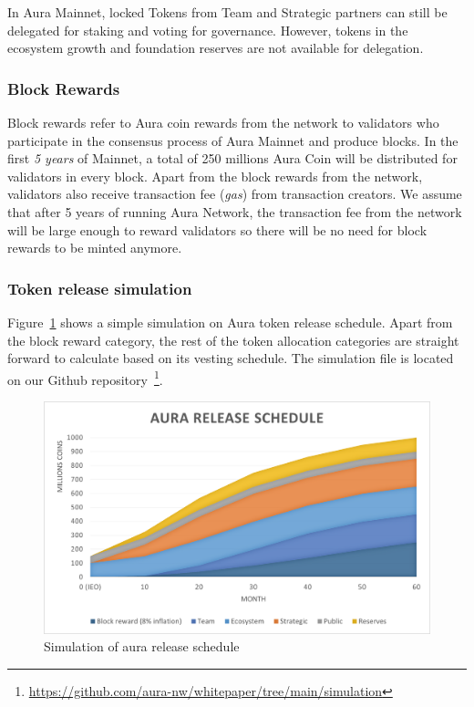 \documentclass[12pt, titlepage]{article}
\begin{document}
In Aura Mainnet, locked Tokens from Team and Strategic partners can still be delegated for staking and voting for governance. However, tokens in the ecosystem growth and foundation reserves are not available for delegation. 

\subsubsection{Block Rewards}
Block rewards refer to Aura coin rewards from the network to validators who participate in the consensus process of Aura Mainnet and produce blocks. In the first \emph{5 years} of Mainnet, a total of 250 millions Aura Coin will be distributed for validators in every block. Apart from the block rewards from the network, validators also receive transaction fee (\emph{gas}) from transaction creators. We assume that after 5 years of running Aura Network, the transaction fee from the network will be large enough to reward validators so there will be no need for block rewards to be minted anymore.

\subsubsection{Token release simulation}

Figure~\ref{fig:release} shows a simple simulation on Aura token release schedule. Apart from the block reward category, the rest of the token allocation categories are straight forward to calculate based on its vesting schedule. The simulation file is located on our Github repository~\footnote{\url{https://github.com/aura-nw/whitepaper/tree/main/simulation}}.

\begin{figure}[ht]
\label{fig:release}
\includegraphics[width=\textwidth]{img/release.png}
\centering
\caption{Simulation of aura release schedule}
\end{figure}
\end{document}
